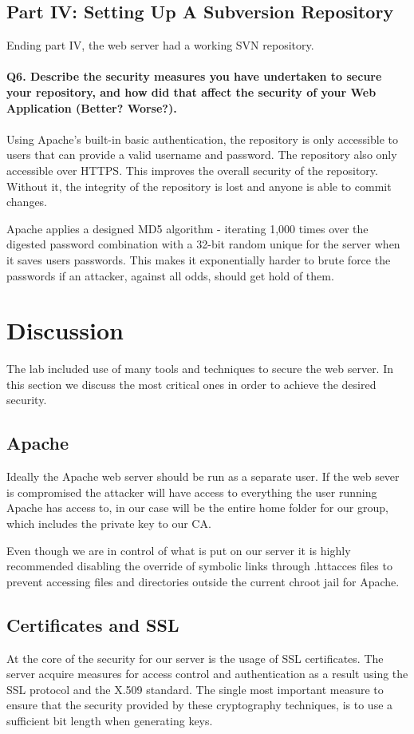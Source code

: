 \documentclass[a4paper, 12pt]{article}
\begin{document}
\subsection{Part IV: Setting Up A Subversion Repository}
Ending part IV, the web server had a working SVN repository. \\ \\
{\bf Q6. Describe the security measures you have undertaken to secure your repository, and
how did that affect the security of your Web Application (Better? Worse?).} \\
\\
Using Apache’s built-in basic authentication, the repository is only accessible to users that can provide a valid username and password. The repository also only accessible over HTTPS. This improves the overall security of the repository. Without it, the integrity of the repository is lost and anyone is able to commit changes.

Apache applies a designed MD5 algorithm - iterating 1,000 times over the digested password combination with a 32-bit random unique for the server \cite{elleve} when it saves users passwords. This makes it exponentially harder to brute force the passwords if an attacker, against all odds, should get hold of them.

\section{Discussion}
The lab included use of many tools and techniques to secure the web server. In this section we discuss the most critical ones in order to achieve the desired security.
\subsection{Apache}
Ideally the Apache web server should be run as a separate user. If the web sever is compromised the attacker will have access to everything the user running Apache has access to, in our case will be the entire home folder for our group, which includes the private key to our CA.

Even though we are in control of what is put on our server it is highly recommended \cite{fjorten} disabling the override of symbolic links through .httacces files to prevent accessing files and directories outside the current chroot jail for Apache.
\subsection{Certificates and SSL}
At the core of the security for our server is the usage of SSL certificates. The server acquire measures for access control and authentication as a result using the SSL protocol and the X.509 standard. The single most important measure to ensure that the security provided by these cryptography techniques, is to use a sufficient bit length when generating keys.
\end{document}
